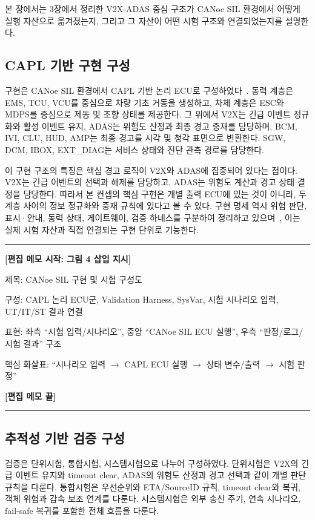 \documentclass[11pt,a4paper]{article}
\newenvironment{editmemo}[1]
{
\par\noindent\rule{\linewidth}{0.4pt}\par
\noindent\textbf{[편집 메모 시작: #1]}\par
\small\itshape
}
{
\par\normalsize\normalfont
\noindent\textbf{[편집 메모 끝]}\par
\noindent\rule{\linewidth}{0.4pt}\par
}
\begin{document}
본 장에서는 3장에서 정리한 V2X-ADAS 중심 구조가 CANoe SIL 환경에서 어떻게 실행 자산으로 옮겨졌는지, 그리고 그 자산이 어떤 시험 구조와 연결되었는지를 설명한다.

\subsection{CAPL 기반 구현 구성}

구현은 CANoe SIL 환경에서 CAPL 기반 논리 ECU로 구성하였다~\cite{canoe}. 동력 계층은 EMS, TCU, VCU를 중심으로 차량 기초 거동을 생성하고, 차체 계층은 ESC와 MDPS를 중심으로 제동 및 조향 상태를 제공한다. 그 위에서 V2X는 긴급 이벤트 정규화와 활성 이벤트 유지, ADAS는 위험도 산정과 최종 경고 중재를 담당하며, BCM, IVI, CLU, HUD, AMP는 최종 경고를 시각 및 청각 표면으로 변환한다. SGW, DCM, IBOX, EXT\_DIAG는 서비스 상태와 진단 관측 경로를 담당한다.

이 구현 구조의 특징은 핵심 경고 로직이 V2X와 ADAS에 집중되어 있다는 점이다. V2X는 긴급 이벤트의 선택과 해제를 담당하고, ADAS는 위험도 계산과 경고 상태 결정을 담당한다. 따라서 본 컨셉의 핵심 구현은 개별 출력 ECU에 있는 것이 아니라, 두 계층 사이의 정보 정규화와 중재 규칙에 있다고 볼 수 있다. 구현 명세 역시 위험 판단, 표시·안내, 동력 상태, 게이트웨이, 검증 하네스를 구분하여 정리하고 있으며~\cite{sw_impl}, 이는 실제 시험 자산과 직접 연결되는 구현 단위로 기능한다.

\begin{editmemo}{그림 4 삽입 지시}
제목: CANoe SIL 구현 및 시험 구성도

구성: CAPL 논리 ECU군, Validation Harness, SysVar, 시험 시나리오 입력, UT/IT/ST 결과 연결

표현: 좌측 ``시험 입력/시나리오'', 중앙 ``CANoe SIL ECU 실행'', 우측 ``판정/로그/시험 결과'' 구조

핵심 화살표: ``시나리오 입력 $\rightarrow$ CAPL ECU 실행 $\rightarrow$ 상태 변수/출력 $\rightarrow$ 시험 판정''
\end{editmemo}

\subsection{추적성 기반 검증 구성}

검증은 단위시험, 통합시험, 시스템시험으로 나누어 구성하였다. 단위시험은 V2X의 긴급 이벤트 유지와 timeout clear, ADAS의 위험도 산정과 경고 선택과 같이 개별 판단 규칙을 다룬다. 통합시험은 우선순위와 ETA/SourceID 규칙, timeout clear와 복귀, 객체 위험과 감속 보조 연계를 다룬다. 시스템시험은 외부 송신 주기, 연속 시나리오, fail-safe 복귀를 포함한 전체 흐름을 다룬다.
\end{document}
